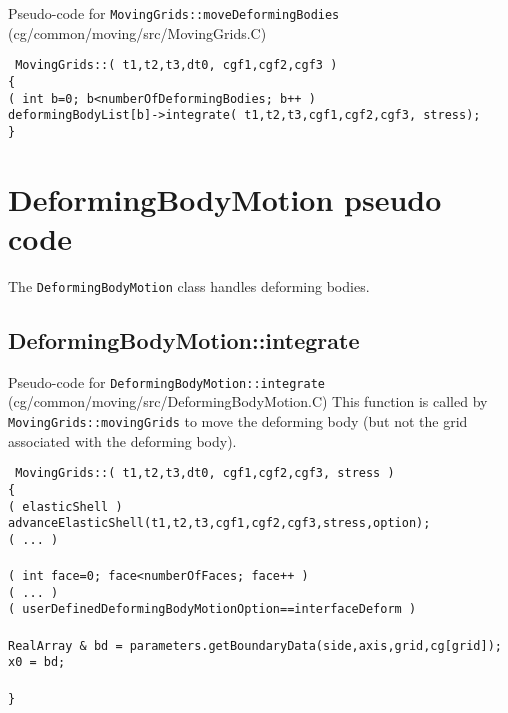 \documentclass[11pt]{article}
\begin{document}
Pseudo-code for {\tt MovingGrids::moveDeformingBodies} (cg/common/moving/src/MovingGrids.C)
\begin{flushleft}\tt
MovingGrids::( t1,t2,t3,dt0, cgf1,cgf2,cgf3 ) \\
\{  \\
\ia  \FOR( int b=0; b<numberOfDeformingBodies; b++ ) \\
\ib    deformingBodyList[b]->integrate( t1,t2,t3,cgf1,cgf2,cgf3, stress); \\
\}
\end{flushleft}

\clearpage 
\section{DeformingBodyMotion pseudo code}

The {\tt DeformingBodyMotion} class handles deforming bodies. 



\subsection{DeformingBodyMotion::integrate}\label{sec:DeformingBodyMotion::integrate}

Pseudo-code for {\tt DeformingBodyMotion::integrate} (cg/common/moving/src/DeformingBodyMotion.C)
This function is called by {\tt MovingGrids::movingGrids} to move the deforming body (but not the
grid associated with the deforming body). 
\begin{flushleft}\tt
MovingGrids::( t1,t2,t3,dt0, cgf1,cgf2,cgf3, stress ) \\
\{  \\
\ia \IF( elasticShell )\\
\ib    advanceElasticShell(t1,t2,t3,cgf1,cgf2,cgf3,stress,option); \\
\ia \ELSEIF( ... ) \\
\ia \\
\ia \FOR( int face=0; face<numberOfFaces; face++ ) \\
\ib   \IF( ... ) \\
\ib   \ELSEIF( userDefinedDeformingBodyMotionOption==interfaceDeform )  \\
\ic     {} \\
\ic     RealArray \& bd = parameters.getBoundaryData(side,axis,grid,cg[grid]); \\
\ic     x0 = bd; \\
\ib \\
\}
\end{flushleft}
\end{document}
